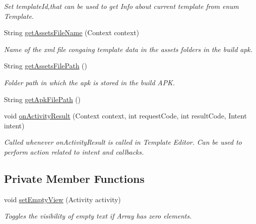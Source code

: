 \begin{DoxyCompactItemize}
\begin{DoxyCompactList}\small\item\em Set template\+Id,that can be used to get Info about current template from enum Template. \end{DoxyCompactList}\item 
String \hyperlink{classorg_1_1buildmlearn_1_1toolkit_1_1templates_1_1MatchTemplate_afa7047f18b2b9d89930c83690df4513f}{get\+Assets\+File\+Name} (Context context)
\begin{DoxyCompactList}\small\item\em Name of the xml file congaing template data in the assets folders in the build apk. \end{DoxyCompactList}\item 
String \hyperlink{classorg_1_1buildmlearn_1_1toolkit_1_1templates_1_1MatchTemplate_a0f64ad63b651268e793e0575784000e5}{get\+Assets\+File\+Path} ()
\begin{DoxyCompactList}\small\item\em Folder path in which the apk is stored in the build A\+PK. \end{DoxyCompactList}\item 
String \hyperlink{classorg_1_1buildmlearn_1_1toolkit_1_1templates_1_1MatchTemplate_afe44606dd181c0eee8424cea76d2dd02}{get\+Apk\+File\+Path} ()
\item 
void \hyperlink{classorg_1_1buildmlearn_1_1toolkit_1_1templates_1_1MatchTemplate_a1d7df9b17b0f0e49baf812fe91722ece}{on\+Activity\+Result} (Context context, int request\+Code, int result\+Code, Intent intent)
\begin{DoxyCompactList}\small\item\em Called whenever on\+Activity\+Result is called in Template Editor. Can be used to perform action related to intent and callbacks. \end{DoxyCompactList}\end{DoxyCompactItemize}
\subsection*{Private Member Functions}
\begin{DoxyCompactItemize}
\item 
void \hyperlink{classorg_1_1buildmlearn_1_1toolkit_1_1templates_1_1MatchTemplate_a3c9f1b7db64c23abeffece457445b96a}{set\+Empty\+View} (Activity activity)
\begin{DoxyCompactList}\small\item\em Toggles the visibility of empty text if Array has zero elements. \end{DoxyCompactList}\end{DoxyCompactItemize}
